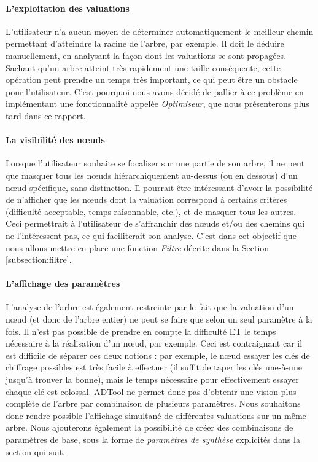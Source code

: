 	 \paragraph{L'exploitation des valuations} L'utilisateur n'a aucun moyen de déterminer automatiquement le \og meilleur chemin \fg{} permettant d'atteindre la racine de l'arbre, par exemple. Il doit le déduire manuellement, en analysant la façon dont les valuations se sont propagées. Sachant qu'un arbre atteint très rapidement une taille conséquente, cette opération peut prendre un temps très important, ce qui peut être un obstacle pour l'utilisateur. C'est pourquoi nous avons décidé de pallier à ce problème en implémentant une fonctionnalité appelée \emph{Optimiseur}, que nous présenterons plus tard dans ce rapport.\\
	
	\paragraph{La visibilité des nœuds} Lorsque l'utilisateur souhaite se focaliser sur une partie de son arbre, il ne peut que masquer tous les nœuds hiérarchiquement au-dessus (ou en dessous) d'un nœud spécifique, sans distinction. Il pourrait être intéressant d'avoir la possibilité de n'afficher que les nœuds dont la valuation correspond à certains critères (difficulté acceptable, temps raisonnable, etc.), et de masquer tous les autres. Ceci permettrait à l'utilisateur de s'affranchir des nœuds et/ou des chemins qui ne l'intéressent pas, ce qui faciliterait son analyse. C'est dans cet objectif que nous allons mettre en place une fonction \emph{Filtre} décrite dans la {\sc Section} \ref{subsection:filtre}.\\

	\paragraph{L'affichage des paramètres} L'analyse de l'arbre est également restreinte par le fait que la valuation d'un nœud (et donc de l'arbre entier) ne peut se faire que selon un seul paramètre à la fois. Il n'est pas possible de prendre en compte la \og difficulté \fg{} ET le \og temps nécessaire \fg{} à la réalisation d'un nœud, par exemple. Ceci est contraignant car il est difficile de séparer ces deux notions : par exemple, le nœud \og essayer les clés de chiffrage possibles \fg{} est très facile à effectuer (il suffit de taper les clés une-à-une jusqu'à trouver la bonne), mais le temps nécessaire pour effectivement essayer chaque clé est colossal. ADTool ne permet donc pas d'obtenir une vision plus complète de l'arbre par combinaison de plusieurs paramètres. Nous souhaitons donc rendre possible l'affichage simultané de différentes valuations sur un même arbre. Nous ajouterons également la possibilité de créer des combinaisons de paramètres de base, sous la forme de \emph{paramètres de synthèse} explicités dans la section qui suit.
	 
	 
	 
